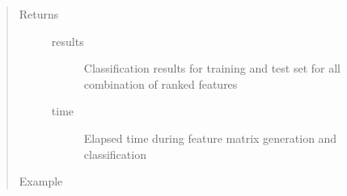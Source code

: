 \documentclass[letterpaper,10pt,english]{sphinxmanual}
\begin{document}
\begin{fulllineitems}
\begin{quote}
\begin{description}
\begin{itemize}
\begin{itemize}
\end{itemize}


\end{itemize}

\item[{Returns}] \leavevmode\begin{description}
\item[{results}] \leavevmode
Classification results for training and test set for all combination of ranked features

\item[{time}] \leavevmode
Elapsed time during feature matrix generation and classification

\end{description}

\item[{Example}] \leavevmode
\begin{sphinxVerbatim}[commandchars=\\\{\}]
   

  \PYG{p}{[}\PYG{p}{]}


\end{sphinxVerbatim}
\end{description}
\end{quote}
\end{fulllineitems}
\end{document}
